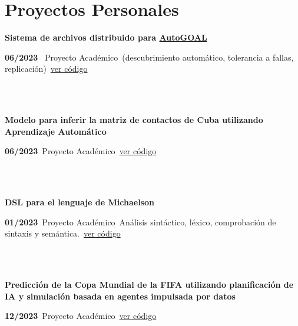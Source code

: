 \documentclass{article}
\begin{document}

\section*{Proyectos Personales}
\begin{minipage}{0.8\textwidth}
\parbox{0.8\linewidth}{\textbf{Sistema de archivos distribuido para \href{https://autogoal.github.io/}{AutoGOAL}}}\hfill \textbf{06/2023} \
Proyecto Académico\
(descubrimiento automático, tolerancia a fallas, replicación)\
\href{https://github.com/geeksLabTech/kade-drive}{ver código}\
\end{minipage} \hfill {}\\\\
\begin{minipage}{0.8\textwidth}
\parbox{0.8\linewidth}{\textbf{Modelo para inferir la matriz de contactos de Cuba utilizando Aprendizaje Automático}} \hfill \textbf{06/2023}\
Proyecto Académico\
\href{https://github.com/geeksLabTech/epidemic-classification-ml-project}{ver código}\
\end{minipage} \hfill {}\\\\
\begin{minipage}{0.8\textwidth}
\parbox{0.8\linewidth}{\textbf{DSL para el lenguaje de Michaelson}} \hfill \textbf{01/2023}\
Proyecto Académico\
Análisis sintáctico, léxico, comprobación de sintaxis y semántica.\
\href{https://github.com/geeksLabTech/compilation-dsl-project}{ver código}\
\end{minipage} \hfill {}\\\\
\begin{minipage}{0.8\textwidth}
\parbox{0.8\linewidth}{\textbf{Predicción de la Copa Mundial de la FIFA utilizando planificación de IA y simulación basada en agentes impulsada por datos}} \hfill \textbf{12/2023}\
Proyecto Académico\
\href{https://github.com/geeksLabTech/FIFA_World_Cup_2022}{ver código}\
\end{minipage} \hfill {}\\\\
\end{document}
